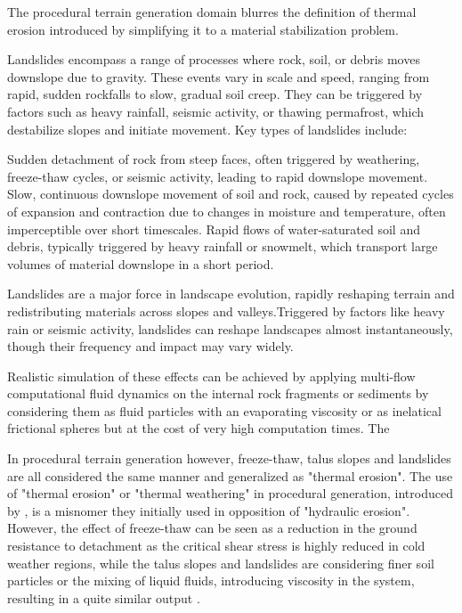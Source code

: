 The procedural terrain generation domain blurres the definition of thermal erosion introduced by \cite{Musgrave1989} simplifying it to a material stabilization problem. 

Landslides encompass a range of processes where rock, soil, or debris moves downslope due to gravity. These events vary in scale and speed, ranging from rapid, sudden rockfalls to slow, gradual soil creep. They can be triggered by factors such as heavy rainfall, seismic activity, or thawing permafrost, which destabilize slopes and initiate movement. Key types of landslides include:
\begin{Itemize}
    
     Sudden detachment of rock from steep faces, often triggered by weathering, freeze-thaw cycles, or seismic activity, leading to rapid downslope movement. 
     Slow, continuous downslope movement of soil and rock, caused by repeated cycles of expansion and contraction due to changes in moisture and temperature, often imperceptible over short timescales.
     Rapid flows of water-saturated soil and debris, typically triggered by heavy rainfall or snowmelt, which transport large volumes of material downslope in a short period.
\end{Itemize}
    
Landslides are a major force in landscape evolution, rapidly reshaping terrain and redistributing materials across slopes and valleys.Triggered by factors like heavy rain or seismic activity, landslides can reshape landscapes almost instantaneously, though their frequency and impact may vary widely.

\smallConclusion

Realistic simulation of these effects can be achieved by applying multi-flow computational fluid dynamics on the internal rock fragments or sediments by considering them as fluid particles with an evaporating viscosity \cite{Feng2024,Harmon2001,Lenaerts2009} or as inelatical frictional spheres \cite{Walton1993} but at the cost of very high computation times. The 

In procedural terrain generation however, freeze-thaw, talus slopes and landslides are all considered the same manner and generalized as "thermal erosion". The use of "thermal erosion" or "thermal weathering" in procedural generation, introduced by \cite{Musgrave1989}, is a misnomer they initially used in opposition of "hydraulic erosion". However, the effect of freeze-thaw can be seen as a reduction in the ground resistance to detachment as the critical shear stress is highly reduced in cold weather regions, while the talus slopes and landslides are considering finer soil particles or the mixing of liquid fluids, introducing viscosity in the system, resulting in a quite similar output \cite{Hudak2011}.

